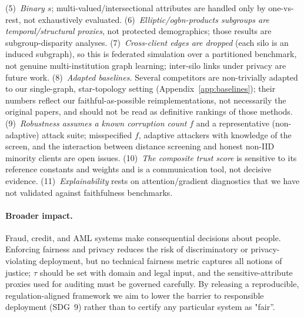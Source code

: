 \documentclass[pdflatex,sn-mathphys-num]{sn-jnl}
\theoremstyle{thmstyleone}%
\theoremstyle{thmstyletwo}%
\theoremstyle{thmstylethree}%
\begin{document}
(5)~\emph{Binary $s$}; multi-valued/intersectional attributes are handled only by
one-vs-rest, not exhaustively evaluated. (6)~\emph{Elliptic/ogbn-products
subgroups are temporal/structural proxies}, not protected demographics; those
results are subgroup-disparity analyses. (7)~\emph{Cross-client edges are
dropped} (each silo is an induced subgraph), so this is federated simulation over
a partitioned benchmark, not genuine multi-institution graph learning; inter-silo
links under privacy are future work. (8)~\emph{Adapted baselines.} Several
competitors are non-trivially adapted to our single-graph, star-topology setting
(Appendix~\ref{app:baselines}); their numbers reflect our faithful-as-possible
reimplementations, not necessarily the original papers, and should not be read as
definitive rankings of those methods. (9)~\emph{Robustness assumes a known
corruption count} $f$ and a representative (non-adaptive) attack suite;
misspecified $f$, adaptive attackers with knowledge of the screen, and the
interaction between distance screening and honest non-IID minority clients are
open issues. (10)~\emph{The composite trust score} is sensitive to its reference
constants and weights and is a communication tool, not decisive evidence.
(11)~\emph{Explainability} rests on attention/gradient diagnostics that we have
not validated against faithfulness benchmarks.

\paragraph{Broader impact.}
Fraud, credit, and AML systems make consequential decisions about people.
Enforcing fairness and privacy reduces the risk of discriminatory or
privacy-violating deployment, but no technical fairness metric captures all
notions of justice; $\tau$ should be set with domain and legal input, and the
sensitive-attribute proxies used for auditing must be governed carefully. By
releasing a reproducible, regulation-aligned framework we aim to lower the
barrier to responsible deployment (SDG~9) rather than to certify any particular
system as "fair''.
\end{document}

